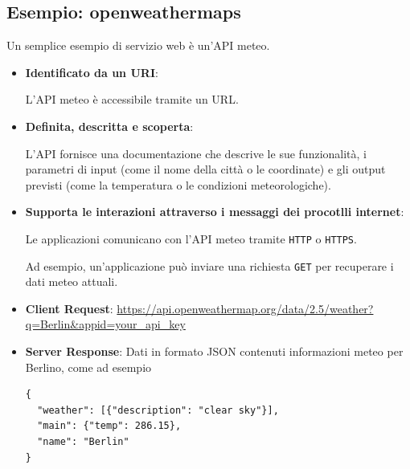 \subsection{Esempio: openweathermaps}
Un semplice esempio di servizio web è un'API meteo.
\begin{itemize}
    \item \textbf{Identificato da un URI}:

    L'API meteo è accessibile tramite un URL.
    \item \textbf{Definita, descritta e scoperta}:

    L'API fornisce una documentazione che descrive le sue funzionalità, i parametri di input (come il nome della città o le coordinate) e gli output previsti (come la temperatura o le condizioni meteorologiche).
    \item \textbf{Supporta le interazioni attraverso i messaggi dei procotlli internet}:

    Le applicazioni comunicano con l'API meteo tramite \texttt{HTTP} o \texttt{HTTPS}.
    
    Ad esempio, un'applicazione può inviare una richiesta \texttt{GET} per recuperare i dati meteo attuali.
\end{itemize}

\begin{tcolorbox}[title={Esempio di interazione}, breakable]
    \begin{itemize}
        \item \textbf{Client Request}: \url{https://api.openweathermap.org/data/2.5/weather?q=Berlin&appid=your_api_key}
        \item \textbf{Server Response}: Dati in formato JSON contenuti informazioni meteo per Berlino, come ad esempio
        \begin{lstlisting}
{
  "weather": [{"description": "clear sky"}],
  "main": {"temp": 286.15},
  "name": "Berlin"
}
        \end{lstlisting}
    \end{itemize}
\end{tcolorbox}

